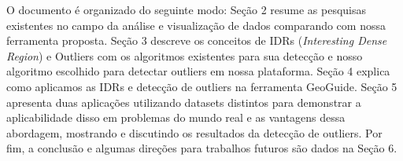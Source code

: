 
O documento é organizado do seguinte modo: Seção 2 resume as pesquisas existentes no campo da análise e visualização de dados comparando com nossa ferramenta proposta. Seção 3 descreve os conceitos de IDRs (\textit{Interesting Dense Region}) e Outliers com os algoritmos existentes para sua detecção e nosso algoritmo escolhido para detectar outliers em nossa plataforma. Seção 4 explica como aplicamos as IDRs e detecção de outliers na ferramenta GeoGuide. Seção 5 apresenta duas aplicações utilizando datasets distintos para demonstrar a aplicabilidade disso em problemas do mundo real e as vantagens dessa abordagem, mostrando e discutindo os resultados da detecção de outliers. Por fim, a conclusão e algumas direções para trabalhos futuros são dados na Seção 6.